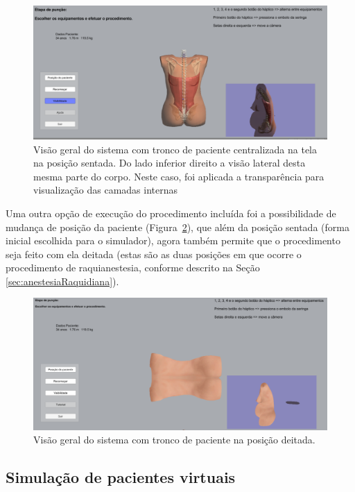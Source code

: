 \begin{figure}[ht!]
    \centering
    \includegraphics[width=0.9\linewidth]{capitulos/figuras/sistema posicao sentada com transparencia.png} 
    \caption{Visão geral do sistema com tronco de paciente centralizada na tela na posição sentada. Do lado inferior direito a visão lateral desta mesma parte do corpo. Neste caso, foi aplicada a transparência para visualização das camadas internas}
    \label{fig:posicaoSentadaComTransparencia}
\end{figure}

Uma outra opção de execução do procedimento incluída foi a possibilidade de mudança de posição da paciente (Figura~\ref{fig:posicaoDeitada}), que além da posição sentada (forma inicial escolhida para o simulador), agora também permite que o procedimento seja feito com ela deitada (estas são as duas posições em que ocorre o procedimento de raquianestesia, conforme descrito na Seção \ref{sec:anestesiaRaquidiana}).

\begin{figure}[ht!]
    \centering
    \includegraphics[width=0.9\linewidth]{capitulos/figuras/sistema posicao deitada.png} 
    \caption{Visão geral do sistema com tronco de paciente na posição deitada.}
    \label{fig:posicaoDeitada}
\end{figure}

\subsection {Simulação de pacientes virtuais} 
\label{sec:SimulacaoPacientesVirtuais}

